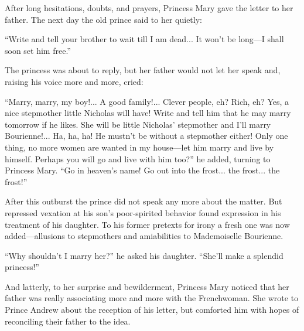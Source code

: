 After long hesitations, doubts, and prayers, Princess Mary gave
the letter to her father. The next day the old prince said to her
quietly:

``Write and tell your brother to wait till I am dead... It won't
be long---I shall soon set him free.''

The princess was about to reply, but her father would not let her
speak and, raising his voice more and more, cried:

``Marry, marry, my boy!... A good family!... Clever people, eh?
Rich, eh?  Yes, a nice stepmother little Nicholas will have!
Write and tell him that he may marry tomorrow if he likes. She
will be little Nicholas' stepmother and I'll marry
Bourienne!... Ha, ha, ha! He mustn't be without a stepmother
either! Only one thing, no more women are wanted in my
house---let him marry and live by himself. Perhaps you will go
and live with him too?'' he added, turning to Princess Mary. ``Go
in heaven's name! Go out into the frost... the frost... the
frost!''

After this outburst the prince did not speak any more about the
matter.  But repressed vexation at his son's poor-spirited
behavior found expression in his treatment of his daughter. To
his former pretexts for irony a fresh one was now
added---allusions to stepmothers and amiabilities to Mademoiselle
Bourienne.

``Why shouldn't I marry her?'' he asked his daughter. ``She'll
make a splendid princess!''

And latterly, to her surprise and bewilderment, Princess Mary
noticed that her father was really associating more and more with
the Frenchwoman. She wrote to Prince Andrew about the reception
of his letter, but comforted him with hopes of reconciling their
father to the idea.

